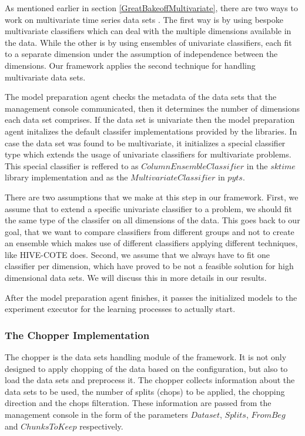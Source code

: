 As mentioned earlier in section \ref{GreatBakeoffMultivariate}, there are two ways to work on multivariate time series data sets \cite{ruiz2020great}.
The first way is by using bespoke multivariate classifiers which can deal with the multiple dimensions available in the data.
While the other is by using ensembles of univariate classifiers, each fit to a separate dimension under the assumption of independence between the dimensions.
Our framework applies the second technique for handling multivariate data sets.

The model preparation agent checks the metadata of the data sets that the management console communicated, then it determines the number of dimensions each data set comprises.
If the data set is univariate then the model preparation agent initalizes the default classifer implementations provided by the libraries.
In case the data set was found to be multivariate, it initializes a special classifier type which extends the usage of univariate classifiers for multivariate problems.
This special classifier is reffered to as $ColumnEnsembleClassifier$ in the $sktime$ library implementation and as the $MultivariateClassifier$ in $pyts$.

There are two assumptions that we make at this step in our framework.
First, we assume that to extend a specific univariate classifier to a problem, we should fit the same type of the classifer on all dimensions of the data.
This goes back to our goal, that we want to compare classifiers from different groups and not to create an ensemble which makes use of different classifiers
applying different techniques, like HIVE-COTE does.
Second, we assume that we always have to fit one classifier per dimension, which have proved to be not a feasible solution for high dimensional data sets.
We will discuss this in more details in our results.

After the model preparation agent finishes, it passes the initialized models to the experiment executor for the learning processes to actually start.


\subsubsection*{The Chopper Implementation}
\label{ChopperImplementation}
The chopper is the data sets handling module of the framework.
It is not only designed to apply chopping of the data based on the configuration, but also to load the data sets and preprocess it.
The chopper collects information about the data sets to be used, the number of splits (chops) to be applied, the chopping direction and the chops filteration.
These information are passed from the management console in the form of the parameters $Dataset$, $Splits$, $FromBeg$ and $ChunksToKeep$ respectively.

